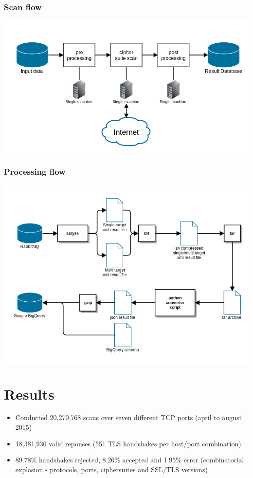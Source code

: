 \documentclass[14pt,aspectratio=43]{beamer}
\begin{document}
\begin{frame}
  \frametitle{Scan flow}
  \begin{center}
    \includegraphics*[scale=0.4]{images/deployment_single_machine.png}
  \end{center}
\end{frame}

\begin{frame}
  \frametitle{Processing flow}
  \begin{center}
    \includegraphics*[scale=0.4]{images/processing_flow.png}
  \end{center}
\end{frame}


\section{Results}
\sectionpage

\begin{frame}
  \begin{itemize}
    \item Conducted 20,270,768 scans over seven different TCP ports (april to august 2015)
    \item 18,381,936 valid reponses (551 TLS handshakes per host/port combination)
    \item 89.78\% handshakes rejected, 8.26\% accepted and 1.95\% error (combinatorial explosion - protocols, ports, ciphersuites and SSL/TLS versions)
  \end{itemize}
\end{frame}
\end{document}

